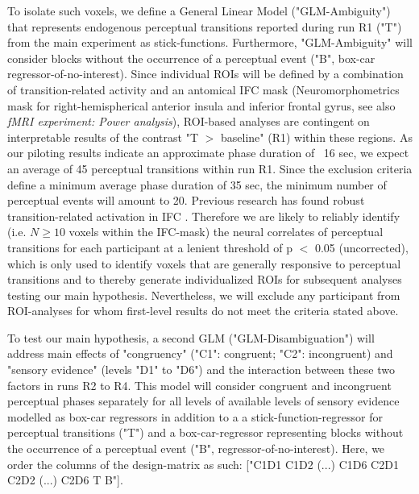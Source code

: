 \documentclass[12pt]{article}
\begin{document}
To isolate such voxels, we define a General Linear Model ("GLM-Ambiguity") that represents endogenous perceptual transitions reported during run R1 ("T") from the main experiment as stick-functions. Furthermore, "GLM-Ambiguity" will consider blocks without the occurrence of a perceptual event ("B", box-car regressor-of-no-interest). Since individual ROIs will be defined by a combination of transition-related activity and an antomical IFC mask (Neuromorphometrics mask for right-hemispherical anterior insula and inferior frontal gyrus, see  also \textit{fMRI experiment: Power analysis}),  ROI-based analyses are contingent on interpretable results of the contrast "T $>$ baseline" (R1) within these regions. As our piloting results indicate an approximate phase duration of ~16 sec, we expect an average of 45 perceptual transitions within run R1. Since the exclusion criteria define a minimum average phase duration of 35 sec, the minimum number of perceptual events will amount to 20. Previous research has found robust transition-related activation in IFC \parencite{Lumer1998, Knapen2011, Weilnhammer2013}. Therefore we are likely to reliably identify (i.e. $N \geq 10$ voxels within the IFC-mask) the neural correlates of perceptual transitions for each participant at a lenient threshold of p $<$ 0.05 (uncorrected), which is only used to identify voxels that are generally responsive to perceptual transitions and to thereby generate individualized ROIs for subsequent analyses testing our main hypothesis. Nevertheless, we will exclude any participant from ROI-analyses for whom first-level results do not meet the criteria stated above.

To test our main hypothesis, a second GLM ("GLM-Disambiguation") will address main effects of "congruency" ("C1": congruent; "C2": incongruent) and "sensory evidence" (levels "D1" to "D6") and the interaction between these two factors in runs R2 to R4. This model will consider congruent and incongruent perceptual phases separately for all levels of available levels of sensory evidence modelled as box-car regressors in addition to a a stick-function-regressor for perceptual transitions ("T") and a box-car-regressor representing blocks without the occurrence of a perceptual event ("B", regressor-of-no-interest). Here, we order the columns of the design-matrix as such: ["C1D1 C1D2 (...) C1D6 C2D1 C2D2 (...) C2D6 T B"]. 
\end{document}
